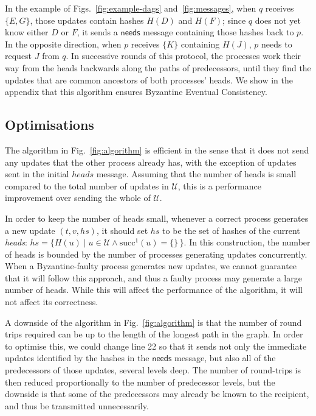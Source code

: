 \documentclass[manuscript]{acmart}
\begin{document}
In the example of Figs.~\ref{fig:example-dags} and~\ref{fig:messages}, when $q$ receives $\{E, G\}$, those updates contain hashes $H(D)$ and $H(F)$; since $q$ does not yet know either $D$ or $F$, it sends a $\mathsf{needs}$ message containing those hashes back to $p$.
In the opposite direction, when $p$ receives $\{K\}$ containing $H(J)$, $p$ needs to request $J$ from $q$.
In successive rounds of this protocol, the processes work their way from the heads backwards along the paths of predecessors, until they find the updates that are common ancestors of both processes' heads.
We show in the appendix that this algorithm ensures Byzantine Eventual Consistency.

\subsection{Optimisations}\label{sec:optimisations}

The algorithm in Fig.~\ref{fig:algorithm} is efficient in the sense that it does not send any updates that the other process already has, with the exception of updates sent in the initial $\mathit{heads}$ message.
Assuming that the number of heads is small compared to the total number of updates in $\mathcal{U}$, this is a performance improvement over sending the whole of $\mathcal{U}$.

In order to keep the number of heads small, whenever a correct process generates a new update $(t, v, \mathit{hs})$, it should set $\mathit{hs}$ to be the set of hashes of the current \emph{heads}:
$\mathit{hs} = \{H(u) \mid u \in \mathcal{U} \wedge \mathrm{succ}^1(u) = \{\}\,\}$.
In this construction, the number of heads is bounded by the number of processes generating updates concurrently.
When a Byzantine-faulty process generates new updates, we cannot guarantee that it will follow this approach, and thus a faulty process may generate a large number of heads.
While this will affect the performance of the algorithm, it will not affect its correctness.

A downside of the algorithm in Fig.~\ref{fig:algorithm} is that the number of round trips required can be up to the length of the longest path in the graph.
In order to optimise this, we could change line 22 so that it sends not only the immediate updates identified by the hashes in the $\mathsf{needs}$ message, but also all of the predecessors of those updates, several levels deep.
The number of round-trips is then reduced proportionally to the number of predecessor levels, but the downside is that some of the predecessors may already be known to the recipient, and thus be transmitted unnecessarily.
\end{document}
